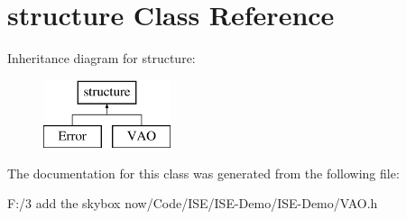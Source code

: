 \hypertarget{classstructure}{\section{structure Class Reference}
\label{classstructure}
}
Inheritance diagram for structure\-:\begin{figure}[H]
\begin{center}
\leavevmode
\includegraphics[height=2.000000cm]{classstructure}
\end{center}
\end{figure}


The documentation for this class was generated from the following file\-:\begin{DoxyCompactItemize}
\item 
F\-:/3 add the skybox now/\-Code/\-I\-S\-E/\-I\-S\-E-\/\-Demo/\-I\-S\-E-\/\-Demo/V\-A\-O.\-h\end{DoxyCompactItemize}
